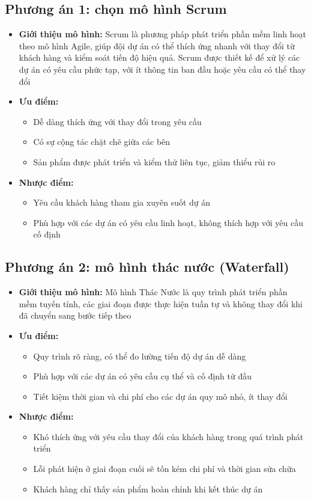 \subsection{Phương án 1: chọn mô hình Scrum}
\begin{itemize}
    \item \textbf{Giới thiệu mô hình:} Scrum là phương pháp phát triển phần mềm linh hoạt theo mô hình Agile, giúp đội dự án có thể thích ứng nhanh với thay đổi từ khách hàng và kiểm soát tiến độ hiệu quả. Scrum được thiết kế để xử lý các dự án có yêu cầu phức tạp, với ít thông tin ban đầu hoặc yêu cầu có thể thay đổi
    \item \textbf{Ưu điểm:}
\begin{itemize}
    \item Dễ dàng thích ứng với thay đổi trong yêu cầu
    \item Có sự cộng tác chặt chẽ giữa các bên
    \item Sản phẩm được phát triển và kiểm thử liên tục, giảm thiểu rủi ro
\end{itemize}
\item \textbf{Nhược điểm:}
\begin{itemize}
    \item Yêu cầu khách hàng tham gia xuyên suốt dự án
    \item Phù hợp với các dự án có yêu cầu linh hoạt, không thích hợp với yêu cầu cố định
\end{itemize}
\end{itemize}
\subsection{Phương án 2: mô hình thác nước (Waterfall)}
\begin{itemize}
    \item \textbf{Giới thiệu mô hình:} Mô hình Thác Nước là quy trình phát triển phần mềm tuyến tính, các giai đoạn được thực hiện tuần tự và không thay đổi khi đã chuyển sang bước tiếp theo
    \item \textbf{Ưu điểm:}
    \begin{itemize}
        \item Quy trình rõ ràng, có thể đo lường tiến độ dự án dễ dàng
        \item Phù hợp với các dự án có yêu cầu cụ thể và cố định từ đầu
        \item Tiết kiệm thời gian và chi phí cho các dự án quy mô nhỏ, ít thay đổi
    \end{itemize}
    \item \textbf{Nhược điểm:} 
    \begin{itemize}
        \item Khó thích ứng với yêu cầu thay đổi của khách hàng trong quá trình phát triển
        \item Lỗi phát hiện ở giai đoạn cuối sẽ tốn kém chi phí và thời gian sửa chữa
        \item Khách hàng chỉ thấy sản phẩm hoàn chỉnh khi kết thúc dự án
    \end{itemize}
\end{itemize}
